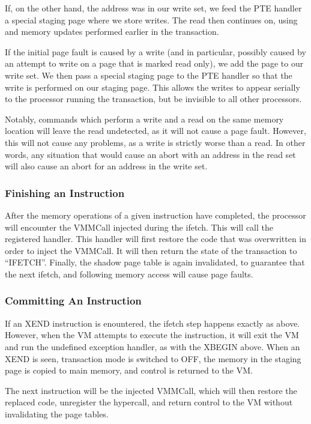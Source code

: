 \documentclass{acm_proc_article-sp}
\begin{document}
If, on the other hand, the address was in our write set, we feed the PTE
handler a special staging page where we store writes. The read then continues
on, using and memory updates performed earlier in the transaction.

If the initial page fault is caused by a write (and in particular, possibly 
caused by an attempt to write on a page that is marked read only), we 
add the page to our write set. We then pass a special staging page to the PTE
handler so that the write is performed on our staging page. This allows the 
writes to appear serially to the processor running the transaction, but be
invisible to all other processors.

Notably, commands which perform a write and a read on the same memory location
will leave the read undetected, as it will not cause a page fault. However,
this will not cause any problems, as a write is strictly worse than a read. In
other words, any situation that would cause an abort with an address in the 
read set will also cause an abort for an address in the write set.

\subsubsection{Finishing an Instruction}

After the memory operations of a given instruction have completed, the 
processor will encounter the VMMCall injected during the ifetch. This will
call the registered handler. This handler will first restore the code that
was overwritten in order to inject the VMMCall. It will then return the state
of the transaction to ``IFETCH''. Finally, the shadow page table is again 
invalidated, to guarantee that the next ifetch, and following memory access 
will cause page faults.  

\subsubsection{Committing An Instruction}

If an XEND instruction is enountered, the ifetch step happens exactly as above.
However, when the VM attempts to execute the instruction, it will exit the VM
and run the undefined exception handler, as with the XBEGIN above. When an XEND
is seen, transaction mode is switched to OFF, the memory in the staging page is
copied to main memory, and control is returned to the VM.

The next instruction will be the injected VMMCall, which will then restore the
replaced code, unregister the hypercall, and return control to the VM without
invalidating the page tables.
\end{document}

